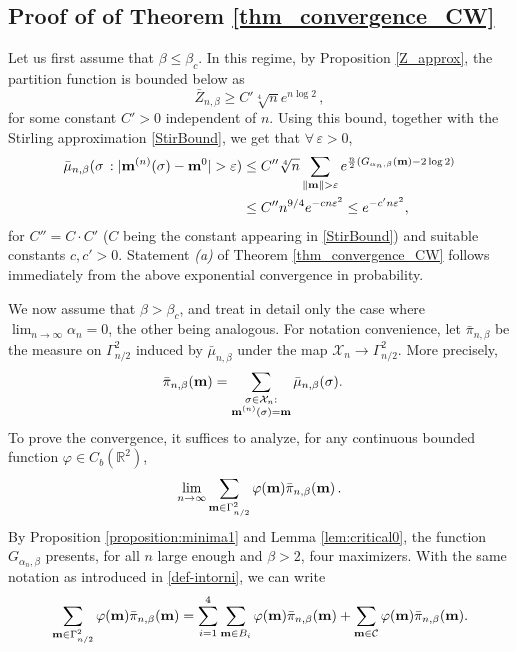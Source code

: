 \documentclass[11pt,oneside]{amsart}
\numberwithin{equation}{section}  %
\theoremstyle{plain}
\theoremstyle{remark}
\def \s {{\sigma}}
\def \m {{\mu}}
\def \G {{\Gamma}}
\def \bm {{\bf m}}
\begin{document}
\subsection{Proof of of Theorem \ref{thm_convergence_CW}}
Let us first assume that $\beta\le\beta_c$. In this regime,
by Proposition \ref{Z_approx}, the partition function is bounded below as
$$ \bar{Z}_{n,\beta}\ge C'\sqrt[4]{n} e^{n\log 2}\,, $$
for some constant $C'>0$ independent of $n$. 
Using this bound, together with the Stirling approximation \eqref{StirBound}, 
we get that  $\forall\, \varepsilon>0$,
\begin{equation}\label{ExpProb}
\begin{split}
\bar{\m}_{n,\beta}(\s\,:|\bm^{(n)}(\s)-\bm^0|>\varepsilon)
&\le C'' \sqrt[4]{n} \sum_{ \|\bm\|>\varepsilon} e^{\frac{n}{2}\left(G_{\alpha_n,\beta}(\bm)-2\log2\right)}\\
&\le 
C'' n^{9/4} e^{- c n \varepsilon^2}\le e^{- c'n\varepsilon^2} ,
\end{split}
\end{equation}
for $C''=C\cdot C'$ ($C$ being the constant appearing in \eqref{StirBound}) and  suitable constants $c,c'>0$. Statement \textit{(a)} of Theorem \ref{thm_convergence_CW} 
follows immediately from the above exponential convergence in probability.


We now assume that $\beta>\beta_c$, and treat in detail only the case where $\lim_{n\to\infty}\alpha_n=0$, the other being analogous. 
For notation convenience, let $\bar{\pi}_{n,\beta}$ be the measure on $\Gamma_{n/2}^2$ induced by $\bar{\mu}_{n,\beta}$ under the map $\mathcal{X}_{n}\to \Gamma_{n/2}^2$. More precisely,
\begin{align}\label{def_measureF_CW}
    &\bar{\pi}_{n,\beta} (\bm)=\sum_{\substack{\sigma \in \mathcal{X}_{n}: \\ \bm^{(n)}(\sigma)=\bm}} \bar{\mu}_{n,\beta}(\sigma).
\end{align}
%
To prove the convergence, it suffices to analyze, for any continuous bounded function $\varphi \in C_b(\mathbb{R}^2)$, 
\begin{align*}
   \lim_{n \to \infty} \sum_{\bm \in \G_{n/2}^2 } \varphi(\bm) \bar{\pi}_{n,\beta}(\bm)\,.
\end{align*}
By Proposition \ref{proposition:minima1} and Lemma \ref{lem:critical0}, 
the function $G_{\alpha_n,\beta}$ presents, for all $n$ large enough and $\beta>2$, four maximizers. 
With the same notation as introduced in \eqref{def-intorni}, we can write
\begin{align}\label{eq:partition_sum}
    \sum_{\bm \in \Gamma_{n/2}^2} \varphi(\bm) \bar{\pi}_{n,\beta}(\bm)=\sum_{i=1}^4\sum_{\bm \in B_i} \varphi(\bm) \bar{\pi}_{n,\beta}(\bm)+\sum_{\bm \in \mathcal{C}} \varphi(\bm) \bar{\pi}_{n,\beta}(\bm).
\end{align}
\end{document}
